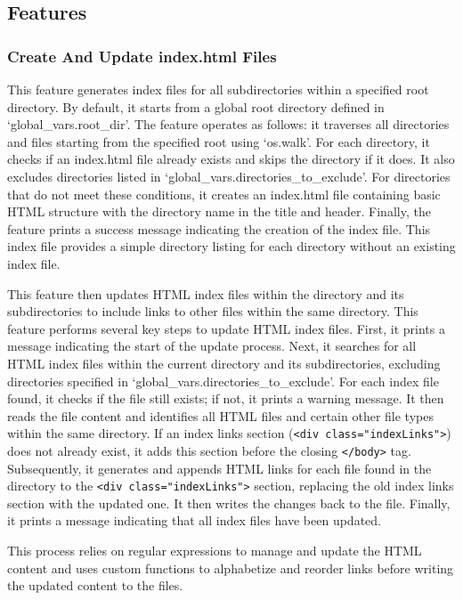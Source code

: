 \subsection{Features}

\subsubsection{Create And Update index.html Files}

This feature generates index files for all subdirectories within a specified root directory. By default, it starts from a global root directory defined in `global\_vars.root_dir'. The feature operates as follows: it traverses all directories and files starting from the specified root using `os.walk'. For each directory, it checks if an index.html file already exists and skips the directory if it does. It also excludes directories listed in `global\_vars.directories\_to\_exclude'. For directories that do not meet these conditions, it creates an index.html file containing basic HTML structure with the directory name in the title and header. Finally, the feature prints a success message indicating the creation of the index file. This index file provides a simple directory listing for each directory without an existing index file.

This feature then updates HTML index files within the directory and its subdirectories to include links to other files within the same directory. This feature performs several key steps to update HTML index files. First, it prints a message indicating the start of the update process. Next, it searches for all HTML index files within the current directory and its subdirectories, excluding directories specified in `global\_vars.directories\_to\_exclude'. For each index file found, it checks if the file still exists; if not, it prints a warning message. It then reads the file content and identifies all HTML files and certain other file types within the same directory. If an index links section (\texttt{<div class="indexLinks">}) does not already exist, it adds this section before the closing \texttt{</body>} tag. Subsequently, it generates and appends HTML links for each file found in the directory to the \texttt{<div class="indexLinks">} section, replacing the old index links section with the updated one. It then writes the changes back to the file. Finally, it prints a message indicating that all index files have been updated.

This process relies on regular expressions to manage and update the HTML content and uses custom functions to alphabetize and reorder links before writing the updated content to the files.

